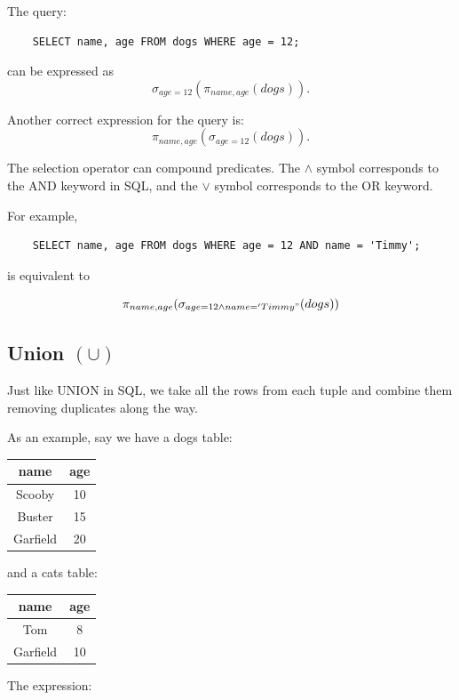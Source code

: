 \documentclass{article}
\begin{document}
The query:
\begin{lstlisting}
    SELECT name, age FROM dogs WHERE age = 12;
\end{lstlisting}

can be expressed as
\[
\sigma_{age=12}(\pi_{name, age}(dogs)).
\]

Another correct expression for the query is:
\[
\pi_{name, age}(\sigma_{age=12}(dogs)).
\]

The selection operator can compound predicates. The $\wedge$ symbol corresponds to the AND keyword in SQL, and the $\vee$ symbol corresponds to the OR keyword.

For example,
\begin{lstlisting}
    SELECT name, age FROM dogs WHERE age = 12 AND name = 'Timmy';
\end{lstlisting}

is equivalent to

\[
\pi_{name, age}(\sigma_{age = 12 \wedge name = 'Timmy"}(dogs))
\]

\subsection{Union $(\cup)$}
\label{sec:Union}
Just like UNION in SQL, we take all the rows from each tuple and combine them removing duplicates along the way.

As an example, say we have a dogs table:

\begin{center}
\begin{tabular}{|c|c|}
\hline
\textbf{name} & \textbf{age} \\
\hline
Scooby & 10 \\
Buster & 15 \\
Garfield & 20 \\
\hline
\end{tabular}
\end{center}

and a cats table:

\begin{center}
\begin{tabular}{|c|c|}
\hline
\textbf{name} & \textbf{age} \\
\hline
Tom & 8 \\
Garfield & 10 \\
\hline
\end{tabular}
\end{center}

The expression:
\end{document}
